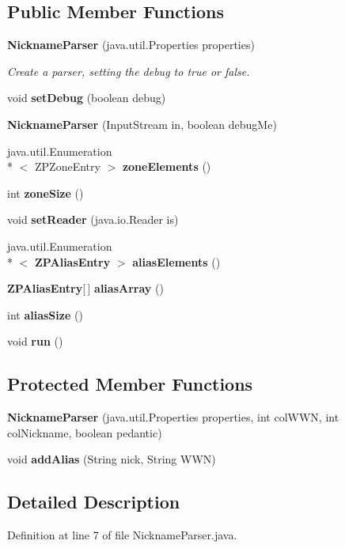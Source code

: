 \subsection*{Public Member Functions}
\begin{DoxyCompactItemize}
\item 
{\bf Nickname\+Parser} (java.\+util.\+Properties properties)
\begin{DoxyCompactList}\small\item\em Create a parser, setting the debug to true or false. \end{DoxyCompactList}\item 
void {\bf set\+Debug} (boolean debug)
\item 
{\bf Nickname\+Parser} (Input\+Stream in, boolean debug\+Me)
\item 
java.\+util.\+Enumeration\\*
$<$ Z\+P\+Zone\+Entry $>$ {\bf zone\+Elements} ()
\item 
int {\bf zone\+Size} ()
\item 
void {\bf set\+Reader} (java.\+io.\+Reader is)
\item 
java.\+util.\+Enumeration\\*
$<$ {\bf Z\+P\+Alias\+Entry} $>$ {\bf alias\+Elements} ()
\item 
{\bf Z\+P\+Alias\+Entry}[$\,$] {\bf alias\+Array} ()
\item 
int {\bf alias\+Size} ()
\item 
void {\bf run} ()
\end{DoxyCompactItemize}
\subsection*{Protected Member Functions}
\begin{DoxyCompactItemize}
\item 
{\bf Nickname\+Parser} (java.\+util.\+Properties properties, int col\+W\+W\+N, int col\+Nickname, boolean pedantic)
\item 
void {\bf add\+Alias} (String nick, String W\+W\+N)
\end{DoxyCompactItemize}


\subsection{Detailed Description}


Definition at line 7 of file Nickname\+Parser.\+java.



